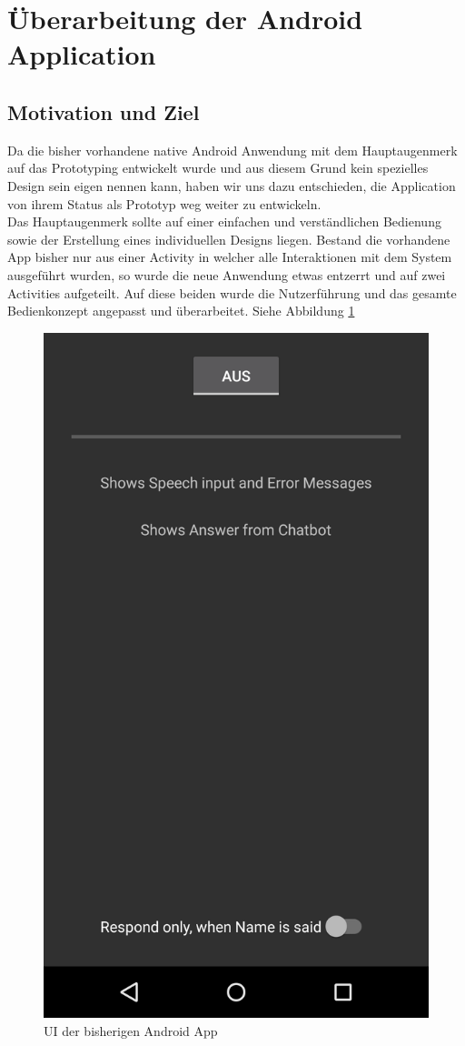 \newpage
\section{Überarbeitung der Android Application}

	\subsection{Motivation und Ziel}\label{motiv}
	Da die bisher vorhandene native Android Anwendung mit dem Hauptaugenmerk auf das Prototyping entwickelt wurde und aus diesem Grund kein spezielles Design sein eigen nennen kann, haben wir uns dazu entschieden, die Application von ihrem Status als Prototyp weg weiter zu entwickeln.\\
	Das Hauptaugenmerk sollte auf einer einfachen und verständlichen Bedienung sowie der Erstellung eines individuellen Designs liegen. Bestand die vorhandene App bisher nur aus einer Activity in welcher alle Interaktionen mit dem System ausgeführt wurden, so wurde die neue Anwendung etwas entzerrt und auf zwei Activities aufgeteilt. Auf diese beiden wurde die Nutzerführung und das gesamte Bedienkonzept angepasst und überarbeitet. Siehe Abbildung \ref{fig:hablame-old}\\

	\begin{figure}[htbp]
		\centering
		\includegraphics[height=0.8\textwidth]{dh/graphics/hablame-old.png}
		\caption{UI der bisherigen Android App}
		\label{fig:hablame-old}
	\end{figure} \leavevmode \\

